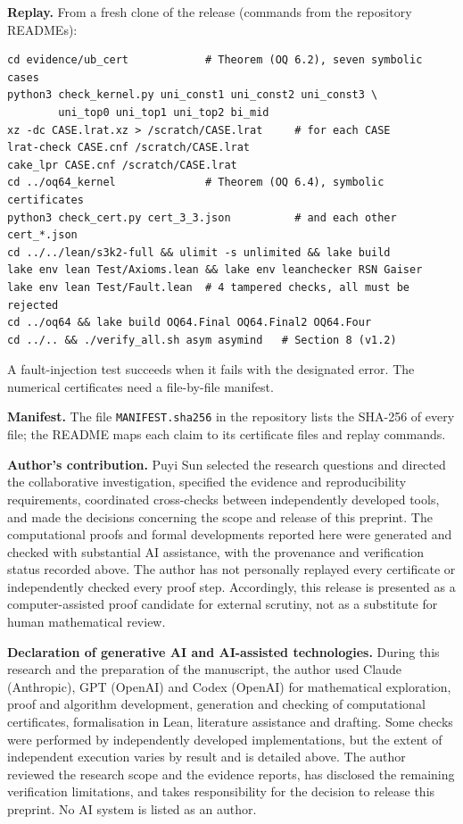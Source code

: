 \documentclass[11pt]{amsart}
\theoremstyle{definition}
\begin{document}
\smallskip\noindent\textbf{Replay.} From a fresh clone of the release (commands from the repository READMEs):
\begin{verbatim}
cd evidence/ub_cert            # Theorem (OQ 6.2), seven symbolic cases
python3 check_kernel.py uni_const1 uni_const2 uni_const3 \
        uni_top0 uni_top1 uni_top2 bi_mid
xz -dc CASE.lrat.xz > /scratch/CASE.lrat     # for each CASE
lrat-check CASE.cnf /scratch/CASE.lrat
cake_lpr CASE.cnf /scratch/CASE.lrat
cd ../oq64_kernel              # Theorem (OQ 6.4), symbolic certificates
python3 check_cert.py cert_3_3.json          # and each other cert_*.json
cd ../../lean/s3k2-full && ulimit -s unlimited && lake build
lake env lean Test/Axioms.lean && lake env leanchecker RSN Gaiser
lake env lean Test/Fault.lean  # 4 tampered checks, all must be rejected
cd ../oq64 && lake build OQ64.Final OQ64.Final2 OQ64.Four
cd ../.. && ./verify_all.sh asym asymind   # Section 8 (v1.2)
\end{verbatim}
A fault-injection test succeeds when it fails with the designated error. The numerical certificates need a file-by-file manifest.


\smallskip\noindent\textbf{Manifest.} The file \texttt{MANIFEST.sha256} in the repository lists the SHA-256 of every file; the README maps each claim to its certificate files and replay commands.


\smallskip\noindent\textbf{Author's contribution.} Puyi Sun selected the research questions and directed the collaborative investigation, specified the evidence and reproducibility requirements, coordinated cross-checks between independently developed tools, and made the decisions concerning the scope and release of this preprint. The computational proofs and formal developments reported here were generated and checked with substantial AI assistance, with the provenance and verification status recorded above. The author has not personally replayed every certificate or independently checked every proof step. Accordingly, this release is presented as a computer-assisted proof candidate for external scrutiny, not as a substitute for human mathematical review.


\smallskip\noindent\textbf{Declaration of generative AI and AI-assisted technologies.} During this research and the preparation of the manuscript, the author used Claude (Anthropic), GPT (OpenAI) and Codex (OpenAI) for mathematical exploration, proof and algorithm development, generation and checking of computational certificates, formalisation in Lean, literature assistance and drafting. Some checks were performed by independently developed implementations, but the extent of independent execution varies by result and is detailed above. The author reviewed the research scope and the evidence reports, has disclosed the remaining verification limitations, and takes responsibility for the decision to release this preprint. No AI system is listed as an author.
\end{document}
